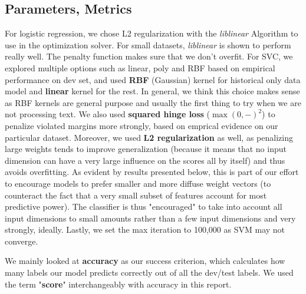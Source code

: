 \documentclass[paper=a4, fontsize=10pt]{scrartcl} %
\numberwithin{equation}{section} %
\numberwithin{figure}{section} %
\numberwithin{table}{section} %
\begin{document}
\subsection{Parameters, Metrics}
For logistic regression, we chose L2 regularization with the \textit{liblinear} Algorithm \cite{hsieh2008dual} to use in the optimization solver. For small datasets, \textit{liblinear} is shown to perform really well. The penalty function makes sure that we don't overfit. 
For SVC, we explored multiple options such as linear, poly and RBF based on empirical performance on dev set, and used \textbf{RBF} (Gaussian) kernel for historical only data model and \textbf{linear} kernel for the rest. In general, we think this choice makes sense as RBF kernels are general purpose and usually the first thing to try when we are not processing text. We also used \textbf{squared hinge loss} ($\max(0,-)^2$) to penalize violated margins more strongly, based on emprical evidence on our particular dataset. Moreover, we used \textbf{L2 regularization} as well, as penalizing large weights tends to improve generalization (because it means that no input dimension can have a very large influence on the scores all by itself) and thus avoids overfitting. As evident by results presented below, this is part of our effort to encourage models to prefer smaller and more diffuse weight vectors (to counteract the fact that a very small subset of features account for most predictive power). The classifier is thus "encouraged" to take into account all input dimensions to small amounts rather than a few input dimensions and very strongly, ideally. Lastly, we set the max iteration to 100,000 as SVM may not converge. 

We mainly looked at \textbf{accuracy} as our success criterion, which calculates how many labels our model predicts correctly out of all the dev/test labels.  We used the term "\textbf{score}" interchangeably with accuracy in this report. 
\end{document}
